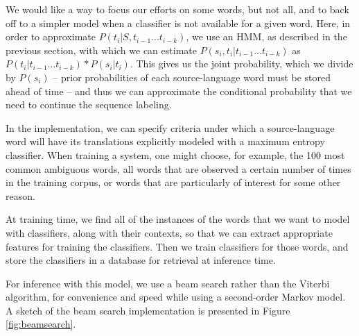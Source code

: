We would like a way to focus our efforts on some words, but not all, and to
back off to a simpler model when a classifier is not available for a given
word. Here, in order to approximate $P(t_i | S, t_{i-1}...t_{i-k})$,
we use an HMM, as described in the previous section, with which we can estimate
$P(s_i, t_i | t_{i-1}...t_{i-k})$ as  
$P(t_i | t_{i-1}...t_{i-k}) * P(s_i | t_i)$.
This gives us the joint probability, which we divide by $P(s_i)$
-- prior probabilities of each source-language word must be stored ahead of
time -- and thus we can approximate the conditional probability that we need to
continue the sequence labeling.

In the implementation, we can specify criteria under which a source-language
word will have its translations explicitly modeled with a maximum entropy
classifier. When training a system, one might choose, for example, the 100 most
common ambiguous words, all words that are observed a certain number of times
in the training corpus, or words that are particularly of interest for some
other reason.

At training time, we find all of the instances of the words that we want to
model with classifiers, along with their contexts, so that we can extract
appropriate features for training the classifiers. Then we train classifiers
for those words, and store the classifiers in a database for retrieval at
inference time.

For inference with this model, we use a beam search rather than the Viterbi
algorithm, for convenience and speed while using a second-order Markov model.
A sketch of the beam search implementation is presented in Figure
\ref{fig:beamsearch}.

